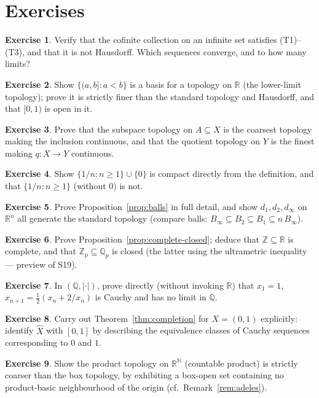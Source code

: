 \documentclass[11pt,a4paper]{article}
\theoremstyle{definition}
\newtheorem{exercise}{Exercise}
\newcommand{\R}{\mathbb{R}}
\newcommand{\Z}{\mathbb{Z}}
\newcommand{\Q}{\mathbb{Q}}
\newcommand{\N}{\mathbb{N}}
\begin{document}
	\section{Exercises}
	\begin{exercise}
		Verify that the cofinite collection on an infinite set satisfies (T1)--(T3), and that it is not
		Hausdorff. Which sequences converge, and to how many limits?
	\end{exercise}
	\begin{exercise}
		Show $\{(a,b]:a<b\}$ is a basis for a topology on $\R$ (the lower-limit topology); prove it is strictly
		finer than the standard topology and Hausdorff, and that $[0,1)$ is open in it.
	\end{exercise}
	\begin{exercise}
		Prove that the subspace topology on $A\subseteq X$ is the coarsest topology making the inclusion
		continuous, and that the quotient topology on $Y$ is the finest making $q:X\to Y$ continuous.
	\end{exercise}
	\begin{exercise}
		Show $\{1/n:n\ge1\}\cup\{0\}$ is compact directly from the definition, and that $\{1/n:n\ge1\}$ (without $0$) is not.
	\end{exercise}
	\begin{exercise}
		Prove Proposition~\ref{prop:balls} in full detail, and show $d_1,d_2,d_\infty$ on $\R^n$ all generate the
		standard topology (compare balls: $B_\infty\subseteq B_2\subseteq B_1\subseteq n\,B_\infty$).
	\end{exercise}
	\begin{exercise}
		Prove Proposition~\ref{prop:complete-closed}; deduce that $\Z\subseteq\R$ is complete, and that
		$\Z_p\subseteq\Q_p$ is closed (the latter using the ultrametric inequality --- preview of S19).
	\end{exercise}
	\begin{exercise}
		In $(\Q,|\cdot|)$, prove directly (without invoking $\R$) that $x_1=1$, $x_{n+1}=\tfrac12(x_n+2/x_n)$ is
		Cauchy and has no limit in $\Q$.
	\end{exercise}
	\begin{exercise}
		Carry out Theorem~\ref{thm:completion} for $X=(0,1)$ explicitly: identify $\hat X$ with $[0,1]$ by
		describing the equivalence classes of Cauchy sequences corresponding to $0$ and $1$.
	\end{exercise}
	\begin{exercise}
		Show the product topology on $\R^\N$ (countable product) is strictly coarser than the box topology, by
		exhibiting a box-open set containing no product-basic neighbourhood of the origin (cf.\ Remark~\ref{rem:adeles}).
	\end{exercise}
\end{document}
